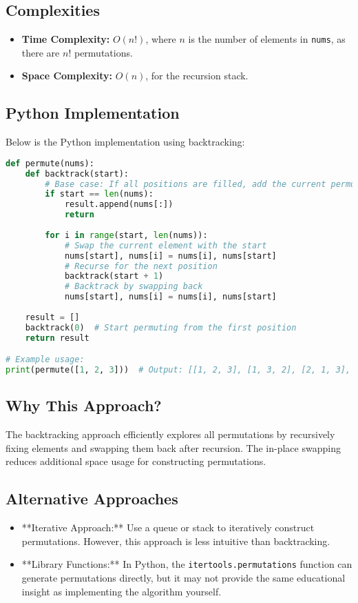 \subsection*{Complexities}
\begin{itemize}
    \item \textbf{Time Complexity:} \(O(n!)\), where \(n\) is the number of elements in \texttt{nums}, as there are \(n!\) permutations.
    \item \textbf{Space Complexity:} \(O(n)\), for the recursion stack.
\end{itemize}

\subsection*{Python Implementation}
Below is the Python implementation using backtracking:

\begin{fullwidth}
\begin{lstlisting}[language=Python]
def permute(nums):
    def backtrack(start):
        # Base case: If all positions are filled, add the current permutation
        if start == len(nums):
            result.append(nums[:])
            return
        
        for i in range(start, len(nums)):
            # Swap the current element with the start
            nums[start], nums[i] = nums[i], nums[start]
            # Recurse for the next position
            backtrack(start + 1)
            # Backtrack by swapping back
            nums[start], nums[i] = nums[i], nums[start]
    
    result = []
    backtrack(0)  # Start permuting from the first position
    return result

# Example usage:
print(permute([1, 2, 3]))  # Output: [[1, 2, 3], [1, 3, 2], [2, 1, 3], [2, 3, 1], [3, 1, 2], [3, 2, 1]]
\end{lstlisting}
\end{fullwidth}

\subsection*{Why This Approach?}
The backtracking approach efficiently explores all permutations by recursively fixing elements and swapping them back after recursion. The in-place swapping reduces additional space usage for constructing permutations.

\subsection*{Alternative Approaches}
\begin{itemize}
    \item **Iterative Approach:** Use a queue or stack to iteratively construct permutations. However, this approach is less intuitive than backtracking.
    \item **Library Functions:** In Python, the \texttt{itertools.permutations} function can generate permutations directly, but it may not provide the same educational insight as implementing the algorithm yourself.
\end{itemize}

